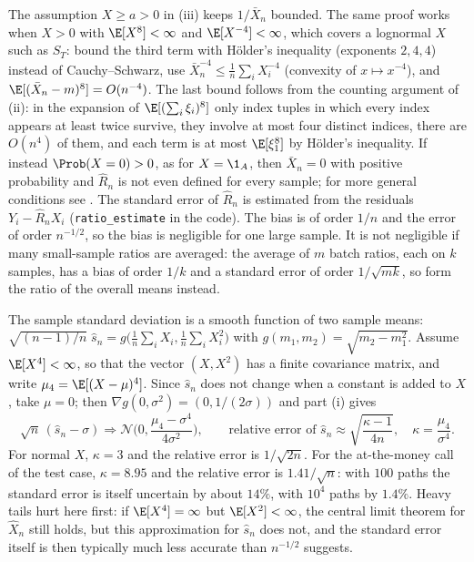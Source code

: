 The assumption $X\ge a>0$ in (iii) keeps $1/\bar X_n$ bounded. The same proof works when
$X>0$ with $\E[X^8]<\infty$ and $\E[X^{-4}]<\infty$, which covers a lognormal $X$ such as
$S_T$: bound the third term with Hölder's inequality (exponents $2,4,4$) instead of
Cauchy--Schwarz, use $\bar X_n^{-4}\le\frac1n\sum_iX_i^{-4}$ (convexity of $x\mapsto x^{-4}$),
and $\E[(\bar X_n-m)^8]=O(n^{-4})$. The last bound follows from the counting argument of (ii):
in the expansion of $\E[(\sum_i\xi_i)^8]$ only index tuples in which every index appears at
least twice survive, they involve at most four distinct indices, there are $O(n^4)$ of them,
and each term is at most $\E[\xi_1^8]$ by Hölder's inequality. If instead $\Prob(X=0)>0$, as
for $X=\1_A$, then $\bar X_n=0$ with positive probability and $\hat R_n$ is not even
defined for every sample; for more general conditions see
\citet[Section~III.3]{asmussen-glynn}. The standard error of $\hat R_n$ is estimated from the
residuals $Y_i-\hat R_nX_i$ (\texttt{ratio\_estimate} in the code). The bias is of order $1/n$
and the error of order $n^{-1/2}$, so the bias is negligible for one large sample. It is not
negligible if many small-sample ratios are averaged: the average of $m$ batch ratios, each
on $k$ samples, has a bias of order $1/k$ and a standard error of order $1/\sqrt{mk}$, so
form the ratio of the overall means instead.

\begin{example}\label{exa:mc-se-accuracy}
The sample standard deviation is a smooth function of two sample means:
$\sqrt{(n-1)/n}\;\hat s_n=g\big(\frac1n\sum_iX_i,\frac1n\sum_iX_i^2\big)$ with
$g(m_1,m_2)=\sqrt{m_2-m_1^2}$. Assume $\E[X^4]<\infty$, so that the vector $(X,X^2)$ has a
finite covariance matrix, and write $\mu_4=\E[(X-\mu)^4]$. Since $\hat s_n$ does not change
when a constant is added to $X$, take $\mu=0$; then $\nabla g(0,\sigma^2)=(0,1/(2\sigma))$
and part (i) gives
\[
  \sqrt n\,(\hat s_n-\sigma)\Rightarrow\mathcal N\Big(0,\frac{\mu_4-\sigma^4}{4\sigma^2}\Big),
  \qquad\text{relative error of }\hat s_n\approx\sqrt{\frac{\kappa-1}{4n}},\quad
  \kappa=\frac{\mu_4}{\sigma^4}.
\]
For normal $X$, $\kappa=3$ and the relative error is $1/\sqrt{2n}$. For the at-the-money call
of the test case, $\kappa=8.95$ and the relative error is $1.41/\sqrt n$: with $100$ paths
the standard error is itself uncertain by about $14\%$, with $10^4$ paths by $1.4\%$. Heavy
tails hurt here first: if $\E[X^4]=\infty$ but $\E[X^2]<\infty$, the central limit theorem
for $\hat X_n$ still holds, but this approximation for $\hat s_n$ does not, and the standard
error itself is then typically much less accurate than $n^{-1/2}$ suggests.
\end{example}

